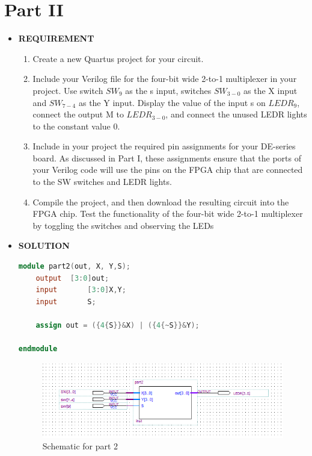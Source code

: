 \section{Part II }
\begin{itemize}
    \item [] \textbf{REQUIREMENT}
        \begin{enumerate}
            \item Create a new Quartus project for your circuit.
            \item Include your Verilog file for the four-bit wide 2-to-1 multiplexer in your project. Use switch $SW_9$ as the s input, switches $SW_{3-0}$ as the X input and $SW_{7-4}$ as the Y input. Display the value of the input s on $LEDR_9$, connect the output M to $LEDR_{3-0}$, and connect the unused LEDR lights to the constant value 0.
            \item Include in your project the required pin assignments for your DE-series board. As discussed in Part I, these assignments ensure that the ports of your Verilog code will use the pins on the FPGA chip that are connected to the SW switches and LEDR lights.
            \item Compile the project, and then download the resulting circuit into the FPGA chip. Test the functionality of the four-bit wide 2-to-1 multiplexer by toggling the switches and observing the LEDs
        \end{enumerate}
    \item [] \textbf{SOLUTION}
        \begin{lstlisting}[language= verilog]
module part2(out, X, Y,S);
	output	[3:0]out;
	input		[3:0]X,Y;
	input		S;
	
	assign out = ({4{S}}&X) | ({4{~S}}&Y);
	
endmodule
        \end{lstlisting}
        \begin{figure}[h]
            \centering
            \includegraphics[scale =0.9]{source/picture/Lab1/Lab1_2.png}
            \caption{Schematic for part 2}
        \end{figure}
\end{itemize}
\clearpage
